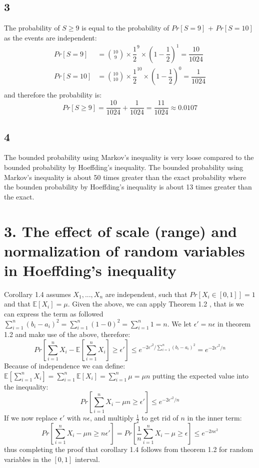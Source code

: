 \documentclass{article}
\begin{document}
\subsection{3}
The probability of $S \geq 9$ is equal to the probability of $Pr[S=9]$ + $Pr[S=10]$ as the events are independent:
\begin{align*}
Pr[S=9] &= \binom{10}{9} \times \dfrac{1}{2}^9 \times \left( 1 - \dfrac{1}{2} \right)^1 = \dfrac{10}{1024} \\
Pr[S=10] &= \binom{10}{10} \times \dfrac{1}{2}^{10} \times \left( 1 - \dfrac{1}{2} \right)^0 = \dfrac{1}{1024} \\
\end{align*}
and therefore the probability is:
\begin{equation*}
Pr[S\geq 9] = \frac{10}{1024} + \frac{1}{1024} = \frac{11}{1024} \approx 0.0107
\end{equation*}
\subsection{4}
The bounded probability using Markov's inequality is very loose compared to the bounded probability by Hoeffding's inequality. The bounded probability using Markov's inequality is about 50 times greater than the exact probability where the bounden probability by Hoeffding's inequality is about 13 times greater than the exact.
\section{3. The effect of scale (range) and normalization of random variables in Hoeffding's inequality}
Corollary 1.4 assumes $ X_1,...,X_n$ are independent, such that $Pr[X_i \in [0,1]] = 1$ and that $\mathbb{E}[X_i]=\mu$. Given the above, we can apply Theorem 1.2 , that is we can express the term as followed $\sum_{i=1}^n (b_i-a_i)^2 = \sum_{i=1}^n (1-0)^2 =
\sum_{i=1}^n 1 = n $. We let $\epsilon' = n\epsilon$ in theorem 1.2 and make use of the above, therefore:
\begin{equation*}
Pr \left[ \sum\limits^n_{i=1} X_i-\mathbb{E} \left[\sum\limits^n_{i=1} X_i \right] \geq \epsilon'\right] \leq e^{ -2 \epsilon'^2 / \sum_{i=1}^n(b_i-a_i)^2  }= e^{-2\epsilon'^2/n}
\end{equation*}
Because of independence we can define:
$\mathbb{E}[\sum_{i = 1}^{n}X_i]= \sum_{i = 1}^{n}\mathbb{E}[X_i] = \sum_{i = 1}^{n} \mu = \mu n $ putting the expected value into the inequality:
\begin{equation*}
Pr \left[ \sum\limits^n_{i=1} X_i - \mu n  \geq \epsilon' \right] \leq e^{-2\epsilon'^2/n}
\end{equation*}
If we now replace $\epsilon'$ with $n\epsilon$, and multiply $\frac{1}{2}$ to get rid of $n$ in the inner term:
\begin{equation*}
Pr \left[ \sum\limits^n_{i=1} X_i - \mu n  \geq n\epsilon' \right] =
Pr \left[ \dfrac{1}{n} \sum\limits^n_{i=1} X_i - \mu  \geq \epsilon \right] 
 \leq e^{-2 n \epsilon^2}
\end{equation*}
thus completing the proof that corollary 1.4 follows from theorem 1.2 for random variables in the $[0,1]$ interval. 
\end{document}
